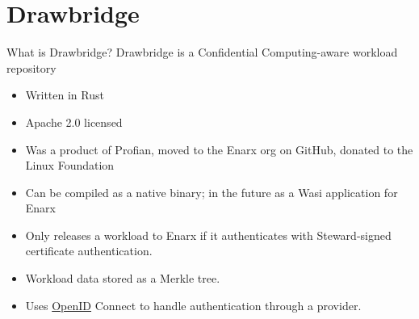 \documentclass[graphics,compress]{beamer}
\begin{document}
\section{Drawbridge}
\begin{frame}{What is Drawbridge?}
Drawbridge is a Confidential Computing-aware workload repository
\begin{itemize}
    \item Written in Rust
    \item Apache 2.0 licensed
    \item Was a product of Profian, moved to the Enarx org on GitHub, donated to the Linux Foundation
    \item Can be compiled as a native binary; in the future as a Wasi application for Enarx
    \item Only releases a workload to Enarx if it authenticates with Steward-signed certificate authentication.
    \item Workload data stored as a Merkle tree.
    \item Uses \href{https://openid.net}{OpenID} Connect to handle authentication through a provider.
\end{itemize}
\end{frame}
\end{document}
